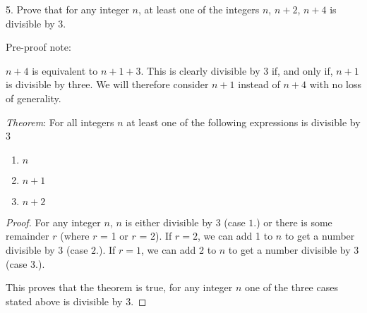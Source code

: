 \documentclass[a4paper,12pt]{article}
\begin{document}
5. Prove that for any integer $n$, at least one of the integers $n$, $n + 2$, $n
+ 4$ is divisible by 3.

Pre-proof note:

$n + 4$ is equivalent to $n + 1 + 3$. This is clearly divisible by 3 if, and
only if, $n + 1$ is divisible by three. We will therefore consider $n + 1$
instead of $n + 4$ with no loss of generality.

\emph{Theorem}: For all integers $n$ at least one of the following expressions is divisible by 3
\begin{enumerate}
	\item $n$
	\item $n + 1$
	\item $n + 2$
\end{enumerate}

\begin{proof}

For any integer $n$, $n$ is either divisible by 3 (case $1.$) or there is some remainder
$r$ (where $r$ = 1 or $r$ = 2).
If $r = 2$, we can add 1 to $n$ to get a number divisible by 3 (case $2.$).
If $r = 1$, we can add 2 to $n$ to get a number divisible by 3 (case $3.$).

This proves that the theorem is true, for any integer $n$ one of the three cases
stated above is divisible by 3.

\end{proof}
\end{document}
